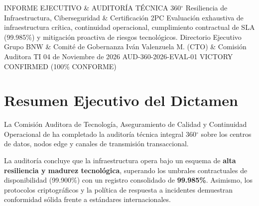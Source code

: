 \documentclass[11pt,letterpaper]{article}
\begin{document}
\makecorporatedarkcover%
  {INFORME EJECUTIVO \& AUDITOR\'IA T\'ECNICA 360$^\circ$}%
  {Resiliencia de Infraestructura, Ciberseguridad \& Certificaci\'on 2PC}%
  {Evaluaci\'on exhaustiva de infraestructura cr\'itica, continuidad operacional, cumplimiento contractual de SLA (99.985\%) y mitigaci\'on proactiva de riesgos tecnol\'ogicos.}%
  {Directorio Ejecutivo Grupo BNW \& Comit\'e de Gobernanza}%
  {Iv\'an Valenzuela M. (CTO) \& Comisi\'on Auditora TI}%
  {04 de Noviembre de 2026}%
  {AUD-360-2026-EVAL-01}%
  {VICTORY CONFIRMED (100\% CONFORME)}


\section{Resumen Ejecutivo del Dictamen}

La Comisi\'on Auditora de Tecnolog\'ia, Aseguramiento de Calidad y Continuidad Operacional de \textbf{\corporatebrandlegal} ha completado la auditor\'ia t\'ecnica integral 360$^\circ$ sobre los centros de datos, nodos edge y canales de transmisi\'on transaccional.

La auditor\'ia concluye que la infraestructura opera bajo un esquema de \textbf{alta resiliencia y madurez tecnol\'ogica}, superando los umbrales contractuales de disponibilidad (99.900\%) con un registro consolidado de \textbf{99.985\%}. Asimismo, los protocolos criptogr\'aficos y la pol\'itica de respuesta a incidentes demuestran conformidad s\'olida frente a est\'andares internacionales.

\vspace{0.4em}
\end{document}
